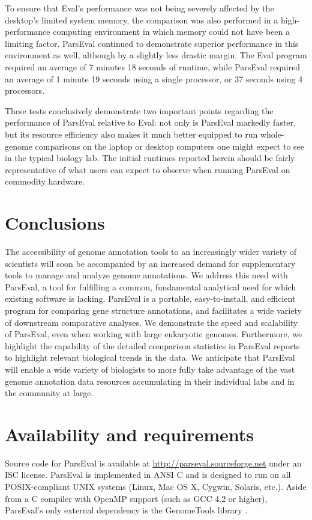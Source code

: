 To ensure that Eval's performance was not being severely affected by the desktop's limited system memory, the comparison was also performed in a high-performance computing environment in which memory could not have been a limiting factor.
ParsEval continued to demonstrate superior performance in this environment as well, although by a slightly less drastic margin.
The Eval program required an average of 7 minutes 18 seconds of runtime, while ParsEval required an average of 1 minute 19 seconds using a single processor, or 37 seconds using 4 processors.

These tests conclusively demonstrate two important points regarding the performance of ParsEval relative to Eval: not only is ParsEval markedly faster, but its resource efficiency also makes it much better equipped to run whole-genome comparisons on the laptop or desktop computers one might expect to see in the typical biology lab.
The initial runtimes reported herein should be fairly representative of what users can expect to observe when running ParsEval on commodity hardware.


\section{Conclusions}
The accessibility of genome annotation tools to an increasingly wider variety of scientists will soon be accompanied by an increased demand for supplementary tools to manage and analyze genome annotations.
We address this need with ParsEval, a tool for fulfilling a common, fundamental analytical need for which existing software is lacking.
ParsEval is a portable, easy-to-install, and efficient program for comparing gene structure annotations, and facilitates a wide variety of downstream comparative analyses.
We demonstrate the speed and scalability of ParsEval, even when working with large eukaryotic genomes.
Furthermore, we highlight the capability of the detailed comparison statistics in ParsEval reports to highlight relevant biological trends in the data.
We anticipate that ParsEval will enable a wide variety of biologists to more fully take advantage of the vast genome annotation data resources accumulating in their individual labs and in the community at large.


\section{Availability and requirements}
Source code for ParsEval is available at \url{http://parseval.sourceforge.net} under an ISC license.
ParsEval is implemented in ANSI C and is designed to run on all POSIX-compliant UNIX systems (Linux, Mac OS X, Cygwin, Solaris, etc.).
Aside from a C compiler with OpenMP support (such as GCC 4.2 or higher), ParsEval's only external dependency is the GenomeTools library \citep{GenomeToolsWebsite}.


